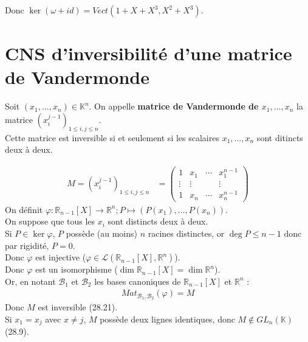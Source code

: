 \documentclass[../main.tex]{subfiles}
\begin{document}
Donc $\ker(\omega + id) = Vect(1 + X + X^3, X^2 + X^3)$. 

\section{CNS d'inversibilité d'une matrice de Vandermonde}
\begin{tcolorbox}[title=Théorème 28.23, title filled=false, colframe=orange, colback=orange!10!white]
    Soit $(x_1, \ldots, x_n)\in \mathbb{K}^n$. On appelle \textbf{matrice de Vandermonde de $x_1, \ldots, x_n$} la matrice $(x_i^{j-1})_{1\leq i,j\leq n}$. \\
    Cette matrice est inversible si et seulement si les scalaires $x_1, \ldots, x_n$ sont ditincts deux à deux. 
\end{tcolorbox}

\begin{align*}
    M = (x_i^{j-1})_{1\leq i,j\leq n} &= \begin{pmatrix}
        1 & x_1 & \cdots & x_1^{n-1} \\
        \vdots & \vdots & & \vdots \\
        1 & x_n & \cdots & x_n^{n-1}
    \end{pmatrix}
\end{align*}
On définit $\varphi:\mathbb{R}_{n-1}[X]\to \mathbb{R}^n; P\mapsto (P(x_1), \ldots, P(x_n))$. \\
On suppose que tous les $x_i$ sont distincts deux à deux. \\
Si $P\in \ker\varphi$, $P$ possède (au moins) $n$ racines distinctes, or $\deg P\leq n-1$ donc par rigidité, $P = 0$. \\
Donc $\varphi$ est injective ($\varphi\in \mathcal{L}(\mathbb{R}_{n-1}[X], \mathbb{R}^n)$). \\
Donc $\varphi$ est un isomorphisme ($\dim \mathbb{R}_{n-1}[X] = \dim \mathbb{R}^n$). \\
Or, en notant $\mathcal{B}_1$ et $\mathcal{B}_2$ les bases canoniques de $\mathbb{R}_{n-1}[X]$ et $\mathbb{R}^n$ : 
\begin{align*}
    Mat_{\mathcal{B}_1, \mathcal{B}_2}(\varphi) = M
\end{align*}
Donc $M$ est inversible (28.21). \\
Si $x_1 = x_j$ avec $x\neq j$, $M$ possède deux lignes identiques, donc $M\not\in GL_n(\mathbb{K})$ (28.9). \\

\end{document}
